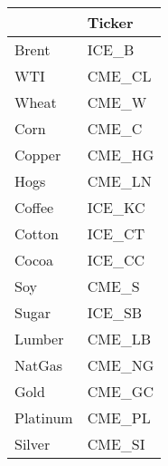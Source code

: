 \begin{tabular}{ll}
\toprule
{} &  Ticker \\
\midrule
Brent    &   ICE\_B \\
WTI      &  CME\_CL \\
Wheat    &   CME\_W \\
Corn     &   CME\_C \\
Copper   &  CME\_HG \\
Hogs     &  CME\_LN \\
Coffee   &  ICE\_KC \\
Cotton   &  ICE\_CT \\
Cocoa    &  ICE\_CC \\
Soy      &   CME\_S \\
Sugar    &  ICE\_SB \\
Lumber   &  CME\_LB \\
NatGas   &  CME\_NG \\
Gold     &  CME\_GC \\
Platinum &  CME\_PL \\
Silver   &  CME\_SI \\
\bottomrule
\end{tabular}
